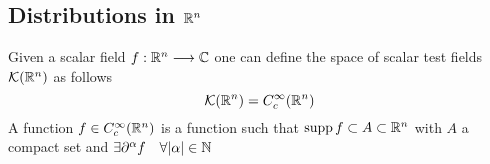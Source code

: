 \documentclass[../complete.tex]{subfiles}
\begin{document}
\subsection{Distributions in $\mathbb{R}^n$}
\begin{dfn}
	Given a scalar field $f:\mathbb{R}^n\overset{}{\longrightarrow}\mathbb{C}$ one can define the space of scalar test fields $\mathcal{K}(\mathbb{R}^n)$ as follows
	\begin{equation}
		\mathcal{K}(\mathbb{R}^n)=C_c^\infty(\mathbb{R}^n)
		\label{eq:scalartestfields}
	\end{equation}
	A function $f\in C_c^\infty(\mathbb{R}^n)$ is a function such that $\operatorname{supp} f\subset A\subset\mathbb{R}^n$ with $A$ a compact set and $\exists\partial^\alpha f\quad\forall\abs{\alpha}\in\mathbb{N}$
\end{dfn}
\end{document}
